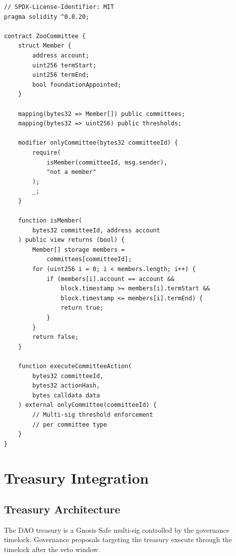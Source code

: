 \documentclass[11pt,letterpaper]{article}
\begin{document}
\begin{lstlisting}[language=Solidity,caption=Committee membership management]
// SPDX-License-Identifier: MIT
pragma solidity ^0.8.20;

contract ZooCommittee {
    struct Member {
        address account;
        uint256 termStart;
        uint256 termEnd;
        bool foundationAppointed;
    }

    mapping(bytes32 => Member[]) public committees;
    mapping(bytes32 => uint256) public thresholds;

    modifier onlyCommittee(bytes32 committeeId) {
        require(
            isMember(committeeId, msg.sender),
            "not a member"
        );
        _;
    }

    function isMember(
        bytes32 committeeId, address account
    ) public view returns (bool) {
        Member[] storage members =
            committees[committeeId];
        for (uint256 i = 0; i < members.length; i++) {
            if (members[i].account == account &&
                block.timestamp >= members[i].termStart &&
                block.timestamp <= members[i].termEnd) {
                return true;
            }
        }
        return false;
    }

    function executeCommitteeAction(
        bytes32 committeeId,
        bytes32 actionHash,
        bytes calldata data
    ) external onlyCommittee(committeeId) {
        // Multi-sig threshold enforcement
        // per committee type
    }
}
\end{lstlisting}

\section{Treasury Integration}
\label{sec:treasury}

\subsection{Treasury Architecture}

The DAO treasury is a Gnosis Safe multi-sig controlled by the governance timelock. Governance proposals targeting the treasury execute through the timelock after the veto window.
\end{document}
